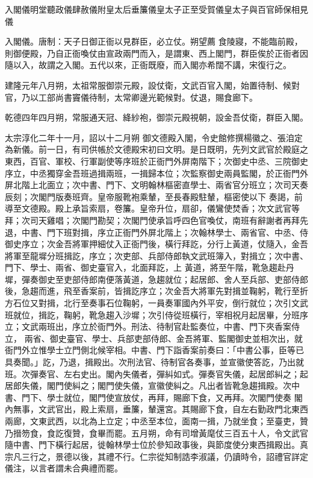 
\begin{pinyinscope}

 入閣儀明堂聽政儀肆赦儀附皇太后垂簾儀皇太子正至受賀儀皇太子與百官師保相見儀



 入閣儀。唐制：天子日御正衙以見群臣，必立仗。朔望薦
 食陵寢，不能臨前殿，則御便殿，乃自正衙喚仗由宣政兩門而入，是謂東、西上閣門，群臣俟於正衙者因隨以入，故謂之入閣。五代以來，正衙既廢，而入閣亦希闊不講，宋復行之。



 建隆元年八月朔，太祖常服御崇元殿，設仗衛，文武百官入閣，始置待制、候對官，乃以工部尚書竇儀待制，太常卿邊光範候對。仗退，賜食廊下。



 乾德四年四月朔，常服通天冠、絳紗袍，御崇元殿視朝，設金吾仗衛，群臣入閣。



 太宗淳化二年十一月，詔以十二月朔
 御文德殿入閣，令史館修撰楊徽之、張洎定為新儀。前一日，有司供帳於文德殿宋初曰文明。是日既明，先列文武官於殿庭之東西，百官、軍校、行軍副使等序班於正衙門外屏南階下；次御史中丞、三院御史序立，中丞獨穿金吾班過揖兩班，一揖歸本位；次監察御史兩員監閣，於正衙門外屏北階上北面立；次中書、門下、文明翰林樞密直學士、兩省官分班立；次司天奏辰刻；次閣門版奏班齊。皇帝服靴袍乘輦，至長春殿駐輦，樞密使以下
 奏謁，前導至文德殿。殿上承旨索扇，卷簾。皇帝升位，扇卻，儀鸞使焚香；次文武官等拜；次司天雞唱；次閣門勘契；次閣門使承旨呼四色官喚仗，南班有辭謝者再拜先退，中書、門下班對揖，序立正衙門外屏北階上；次翰林學士、兩省官、中丞、侍御史序立；次金吾將軍押細仗入正衙門後，橫行拜訖，分行上黃道，仗隨入，金吾將軍至龍墀分班揖訖，序立；次吏部、兵部侍郎執文武班簿入，對揖立；次中書、門下、學士、兩省、御史臺官入，北面拜訖，上
 黃道，將至午階，靴急趨赴丹墀，彈奏御史至吏部侍郎南便落黃道，急趨就位；起居郎、舍人至兵部、吏部侍郎後，急趨而進，飛至香案前，皆揖訖序立；次金吾大將軍先對揖並鞠躬，靴行至折方石位又對揖，北行至奏事石位鞠躬，一員奏軍國內外平安，倒行就位；次引文武班就位，揖訖，鞠躬，靴急趨入沙墀；次引侍從班橫行，宰相祝月起居畢，分班序立；文武兩班出，序立於衙門外。刑法、待制官赴監奏位，中書、門下夾香案侍立，
 兩省、御史臺官、學士、兵部吏部侍郎、金吾將軍、監閣御史並相次出，就衙門外立惟學士立門側北候宰相。中書、門下詣香案前奏曰：「中書公事，臣等已具奏聞。」訖，乃退，揖殿出。次刑法官、待制官各奏事，並宣徽使答訖，乃出就班。次彈奏官、左右史出。閣內失儀者，彈糾如式。彈奏官失儀，起居郎糾之；起居郎失儀，閣門使糾之；閣門使失儀，宣徽使糾之。凡出者皆靴急趨揖殿。次中書、門下、學士就位，閣門使宣放仗，再拜，賜廊下食，又再拜。次閣門使奏
 閣內無事，文武官出，殿上索扇，垂簾，輦還宮。其賜廊下食，自左右勤政門北東西兩廊，文東武西，以北為上立定；中丞至本位，面南一揖，乃就坐食；至臺吏，贊乃搢笏食，食訖復贊，食畢而罷。五月朔，命有司增黃麾仗三百五十人，令文武官隨中書、門下橫行起居，徙翰林學士位於參知政事後，與節度使分東西揖殿出。真宗凡三行之，景德以後，其禮不行。仁宗從知制誥李淑議，仍讀時令，詔禮官詳定儀注，以言者謂未合典禮而罷。




\end{pinyinscope}
